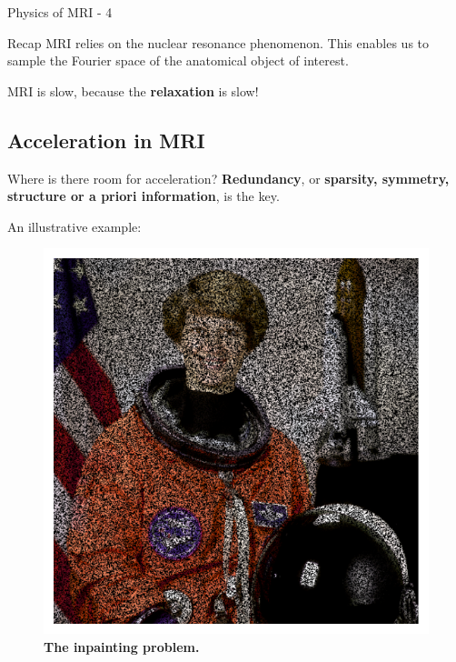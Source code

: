 \begin{frame}{Physics of MRI - 4}
    \begin{block}{Recap}
        MRI relies on the nuclear resonance phenomenon. This enables us to sample the Fourier space of the anatomical object of interest.
    \end{block}
    \pause
    MRI is slow, because the \textbf{relaxation} is slow!
\end{frame}

\subsection{Acceleration in MRI}
\begin{frame}{Where is there room for acceleration?}
    \textbf{Redundancy}, or \textbf{sparsity, symmetry, structure or a priori information}, is the key.\\
    
    \begin{overprint}
        \hfill \break
    An illustrative example:
    \begin{figure}
        \centering
        \includegraphics[height=0.4\textheight]{Figures/intro_figures/astronaut_masked.pdf}
        \caption{\label{fig:astronaut-masked}\textbf{The inpainting problem.} 
        }
    \end{figure}
    

\end{overprint}
\end{frame}

